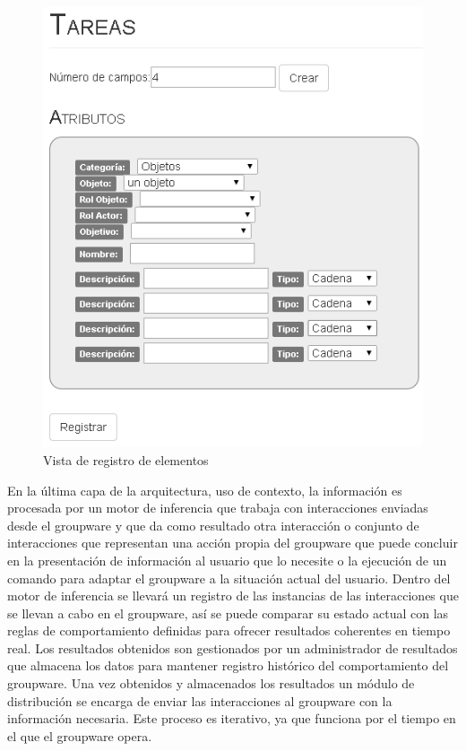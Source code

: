 \begin{figure}[h!]
\centering
\includegraphics[scale=.6]{images/TareasProto.png}
\caption{Vista de registro de elementos}
\label{Ptf:registro}
\end{figure}

En la \'ultima capa de la arquitectura, uso de contexto, la informaci\'on es procesada por un motor de inferencia que trabaja con interacciones enviadas desde el groupware y  que da como resultado otra interacci\'on o conjunto de interacciones que representan una acci\'on propia del groupware que puede concluir en la presentaci\'on de informaci\'on al usuario que lo necesite o la ejecuci\'on de un comando para adaptar el groupware a la situaci\'on actual del usuario. Dentro del motor de inferencia se llevar\'a un registro de las instancias de las interacciones que se llevan a cabo en el groupware, as\'i se puede comparar su estado actual con las reglas de comportamiento definidas para ofrecer resultados coherentes en tiempo real. Los resultados obtenidos son gestionados por un administrador de resultados que almacena los datos para mantener registro hist\'orico del comportamiento del groupware. Una vez obtenidos y almacenados los resultados un m\'odulo de distribuci\'on se encarga de enviar las interacciones al groupware con la informaci\'on necesaria. Este proceso es iterativo, ya que funciona por el tiempo en el que el groupware opera.

